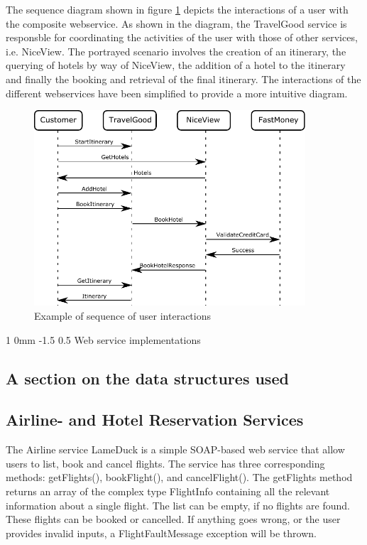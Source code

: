 \documentclass[english, a4paper, 12pt]{article}
\makeatletter
\renewcommand{\section}{\@startsection
{section}%
{1}%
{0mm}%
{-1.5\baselineskip}%
{0.5\baselineskip}%
{\normalfont\Large\bfseries}} %
\makeatother
\begin{document}
The sequence diagram shown in figure \ref{fig:sequence} depicts the interactions of a user with the composite webservice. As shown in the diagram, the TravelGood service is responsble for coordinating the activities of the user with those of other services, i.e. NiceView. The portrayed scenario involves the creation of an itinerary, the querying of hotels by way of NiceView, the addition of a hotel to the itinerary and finally the booking and retrieval of the final itinerary. The interactions of the different webservices have been simplified to provide a more intuitive diagram.

\begin{figure}[h!]
\centering
\includegraphics[width=0.9\textwidth]{figures/SequenceDiagram.pdf}
\caption{Example of sequence of user interactions}
\label{fig:sequence}
\end{figure}



\section{Web service implementations}


\subsection{A section on the data structures used}


\subsection{Airline- and Hotel Reservation Services}
The Airline service LameDuck is a simple SOAP-based web service that allow users to list, book and cancel flights. The service has three corresponding methods: getFlights(), bookFlight(), and cancelFlight(). The getFlights method returns an array of the complex type FlightInfo containing all the relevant information about a single flight. The list can be empty, if no flights are found. These flights can be booked or cancelled. If anything goes wrong, or the user provides invalid inputs, a FlightFaultMessage exception will be thrown. 
\end{document}
